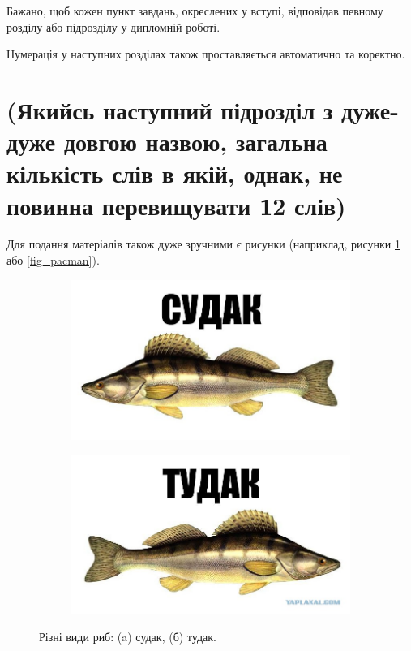 Бажано, щоб кожен пункт завдань, окреслених у вступі, відповідав певному
розділу або підрозділу у дипломній роботі.

\begin{theorem}
    Нумерація у наступних розділах також проставляється автоматично та коректно.
\end{theorem}

\section{(Якийсь наступний підрозділ з дуже-дуже довгою назвою, загальна кількість слів в якій, однак, не повинна перевищувати 12 слів)}

Для подання матеріалів також дуже зручними є рисунки (наприклад, рисунки
\ref{fig_sudak} або \ref{fig_pacman}).

\begin{figure}[ht]
    \centering
    \begin{subfigure}[b]{0.5\textwidth}
        \includegraphics[scale=0.3]{Images/Sudak.png}
        \caption{}
    \end{subfigure}%
    \begin{subfigure}[b]{0.5\textwidth}
        \includegraphics[scale=0.3]{Images/Tudak.png}
        \caption{}
    \end{subfigure}

    \caption{Різні види риб: (a) судак, (б) тудак.}
    \label{fig_sudak}
\end{figure}

